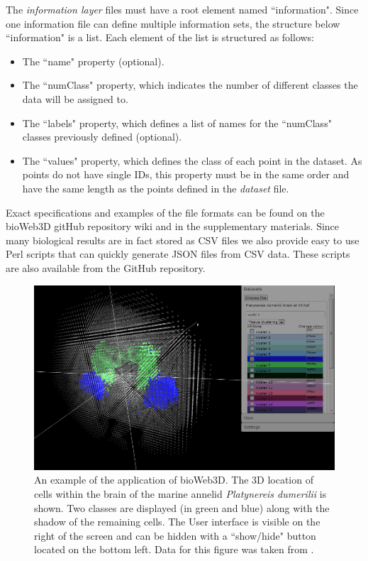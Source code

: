 \documentclass{bioinfo}
\begin{document}
The {\it{information layer}} files must have a root element named  ``information". Since one information file can define multiple information sets, the structure below ``information" is a list. Each element of the list is structured as follows:
\begin{itemize}
\item{ The ``name" property (optional).}
\item{The ``numClass" property, which indicates the number of different classes the data will be assigned to.}
\item{The ``labels" property, which defines a list of names for the ``numClass" classes previously defined (optional).}
\item{The ``values" property, which defines the class of each point in the dataset. As points do not have single IDs, this property must be in the same order and have the same length as the points defined in the {\it{dataset}} file.}
\end{itemize}
Exact specifications and examples of the file formats can be found on the bioWeb3D gitHub repository wiki and in the supplementary materials. Since many biological results are in fact stored as CSV files we also provide easy to use Perl scripts that can quickly generate JSON files from CSV data. These scripts are also available from the GitHub repository.


\begin{figure}[h!]%
\centerline{\includegraphics[totalheight=0.2\textheight]{fig1.png}}
\caption{An example of the application of bioWeb3D. The 3D location of cells within the brain of the marine annelid {\it{Platynereis dumerilii}} is shown. Two classes are displayed (in green and blue) along with the shadow of the remaining cells. The User interface is visible on the right of the screen and can be hidden with a ``show/hide" button located on the bottom left. Data for this figure was taken from \citep{Tomer10}.}\label{fig:01}
\end{figure}
\end{document}

